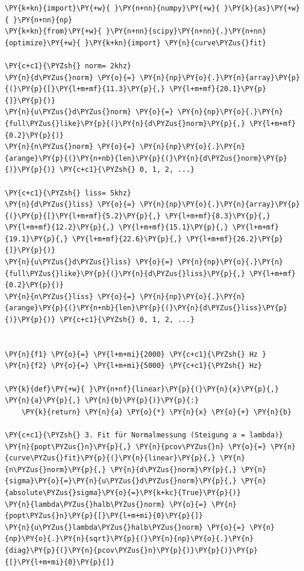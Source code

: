     \begin{tcolorbox}[breakable, size=fbox, boxrule=1pt, pad at break*=1mm,colback=cellbackground, colframe=cellborder]
\begin{Verbatim}[commandchars=\\\{\}]
\PY{k+kn}{import}\PY{+w}{ }\PY{n+nn}{numpy}\PY{+w}{ }\PY{k}{as}\PY{+w}{ }\PY{n+nn}{np}
\PY{k+kn}{from}\PY{+w}{ }\PY{n+nn}{scipy}\PY{n+nn}{.}\PY{n+nn}{optimize}\PY{+w}{ }\PY{k+kn}{import} \PY{n}{curve\PYZus{}fit}

\PY{c+c1}{\PYZsh{} norm= 2khz}
\PY{n}{d\PYZus{}norm} \PY{o}{=} \PY{n}{np}\PY{o}{.}\PY{n}{array}\PY{p}{(}\PY{p}{[}\PY{l+m+mf}{11.3}\PY{p}{,} \PY{l+m+mf}{20.1}\PY{p}{]}\PY{p}{)}
\PY{n}{u\PYZus{}d\PYZus{}norm} \PY{o}{=} \PY{n}{np}\PY{o}{.}\PY{n}{full\PYZus{}like}\PY{p}{(}\PY{n}{d\PYZus{}norm}\PY{p}{,} \PY{l+m+mf}{0.2}\PY{p}{)}
\PY{n}{n\PYZus{}norm} \PY{o}{=} \PY{n}{np}\PY{o}{.}\PY{n}{arange}\PY{p}{(}\PY{n+nb}{len}\PY{p}{(}\PY{n}{d\PYZus{}norm}\PY{p}{)}\PY{p}{)} \PY{c+c1}{\PYZsh{} 0, 1, 2, ...}

\PY{c+c1}{\PYZsh{} liss= 5khz}
\PY{n}{d\PYZus{}liss} \PY{o}{=} \PY{n}{np}\PY{o}{.}\PY{n}{array}\PY{p}{(}\PY{p}{[}\PY{l+m+mf}{5.2}\PY{p}{,} \PY{l+m+mf}{8.3}\PY{p}{,} \PY{l+m+mf}{12.2}\PY{p}{,} \PY{l+m+mf}{15.1}\PY{p}{,} \PY{l+m+mf}{19.1}\PY{p}{,} \PY{l+m+mf}{22.6}\PY{p}{,} \PY{l+m+mf}{26.2}\PY{p}{]}\PY{p}{)}
\PY{n}{u\PYZus{}d\PYZus{}liss} \PY{o}{=} \PY{n}{np}\PY{o}{.}\PY{n}{full\PYZus{}like}\PY{p}{(}\PY{n}{d\PYZus{}liss}\PY{p}{,} \PY{l+m+mf}{0.2}\PY{p}{)}
\PY{n}{n\PYZus{}liss} \PY{o}{=} \PY{n}{np}\PY{o}{.}\PY{n}{arange}\PY{p}{(}\PY{n+nb}{len}\PY{p}{(}\PY{n}{d\PYZus{}liss}\PY{p}{)}\PY{p}{)} \PY{c+c1}{\PYZsh{} 0, 1, 2, ...}


\PY{n}{f1} \PY{o}{=} \PY{l+m+mi}{2000} \PY{c+c1}{\PYZsh{} Hz }
\PY{n}{f2} \PY{o}{=} \PY{l+m+mi}{5000} \PY{c+c1}{\PYZsh{} Hz}

\PY{k}{def}\PY{+w}{ }\PY{n+nf}{linear}\PY{p}{(}\PY{n}{x}\PY{p}{,} \PY{n}{a}\PY{p}{,} \PY{n}{b}\PY{p}{)}\PY{p}{:}
    \PY{k}{return} \PY{n}{a} \PY{o}{*} \PY{n}{x} \PY{o}{+} \PY{n}{b}

\PY{c+c1}{\PYZsh{} 3. Fit für Normalmessung (Steigung a = lambda)}
\PY{n}{popt\PYZus{}n}\PY{p}{,} \PY{n}{pcov\PYZus{}n} \PY{o}{=} \PY{n}{curve\PYZus{}fit}\PY{p}{(}\PY{n}{linear}\PY{p}{,} \PY{n}{n\PYZus{}norm}\PY{p}{,} \PY{n}{d\PYZus{}norm}\PY{p}{,} \PY{n}{sigma}\PY{o}{=}\PY{n}{u\PYZus{}d\PYZus{}norm}\PY{p}{,} \PY{n}{absolute\PYZus{}sigma}\PY{o}{=}\PY{k+kc}{True}\PY{p}{)}
\PY{n}{lambda\PYZus{}halb\PYZus{}norm} \PY{o}{=} \PY{n}{popt\PYZus{}n}\PY{p}{[}\PY{l+m+mi}{0}\PY{p}{]}
\PY{n}{u\PYZus{}lambda\PYZus{}halb\PYZus{}norm} \PY{o}{=} \PY{n}{np}\PY{o}{.}\PY{n}{sqrt}\PY{p}{(}\PY{n}{np}\PY{o}{.}\PY{n}{diag}\PY{p}{(}\PY{n}{pcov\PYZus{}n}\PY{p}{)}\PY{p}{)}\PY{p}{[}\PY{l+m+mi}{0}\PY{p}{]}


\end{Verbatim}
\end{tcolorbox}
